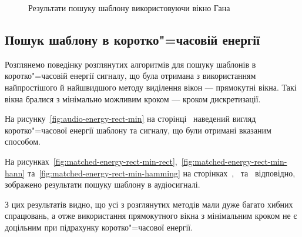 \begin{figure}[h]
            \caption{Результати пошуку шаблону використовуючи вікно Гана}
            \label{fig:audio-plain-hanning}
        \end{figure}
        \clearpage
    \subsection{Пошук шаблону в коротко"=часовій енергії}
        Розглянемо поведінку розглянутих алгоритмів для пошуку шаблонів в коротко"=часовій енергії сигналу, що
        була отримана з використанням найпростішого й найшвидшого методу виділення вікон --- прямокутні вікна.
        Такі вікна бралися з мінімально можливим кроком --- кроком дискретизації.

        На рисунку~\ref{fig:audio-energy-rect-min} на сторінці~\pageref{fig:audio-energy-rect-min} наведений
        вигляд коротко"=часової енергії шаблону та сигналу, що були отримані вказаним способом.

        На рисунках~\ref{fig:matched-energy-rect-min-rect},~\ref{fig:matched-energy-rect-min-hann}
        та~\ref{fig:matched-energy-rect-min-hamming} на
        сторінках~\pageref{fig:matched-energy-rect-min-rect},~\pageref{fig:matched-energy-rect-min-hann}
        та~\pageref{fig:matched-energy-rect-min-hamming} відповідно, зображено результати пошуку шаблону в
        аудіосигналі.

        З цих результатів видно, що усі з розглянутих методів мали дуже багато хибних спрацювань,
        а отже використання прямокутного вікна з мінімальним кроком не є доцільним при підрахунку коротко"=часової
        енергії.

